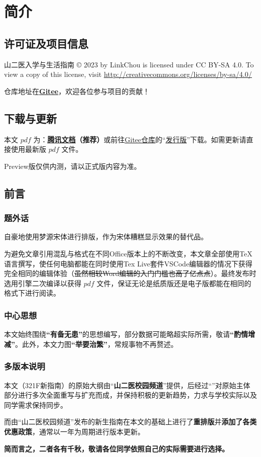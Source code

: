 \chapter[简介]{简介}

\section[许可证及项目信息]{许可证及项目信息}
山二医入学与生活指南 © 2023 by LinkChou is licensed under CC BY-SA 4.0. To view a copy of this license, visit \uline{\href{http://creativecommons.org/licenses/by-sa/4.0/}{http://creativecommons.org/licenses/by-sa/4.0/}}

仓库地址在\textbf{\uline{\href{https://gitee.com/mikazo/guide_for_freshman}{Gitee}}}，欢迎各位参与项目的贡献！

\section[\textcolor{red}{下载与更新}]{下载与更新}
本文 $pdf$ \textbf{}为：\textbf{\uline{\textcolor{red}{\href{https://docs.qq.com/s/ETcQ-ZFSrSsh6MK9bm773q}{腾讯文档}}}（推荐）}或前往\uline{\href{https://gitee.com/mikazo/guide_for_freshman}{Gitee仓库}}的“\uline{\href{https://gitee.com/mikazo/latex_version/releases/latest}{发行版}}”下载。如需更新请直接使用最新版 $pdf$ 文件。

Preview版仅供内测，请以正式版内容为准。

\section[前言]{前言}
\subsection[题外话]{题外话}
自豪地使用梦源宋体进行排版，作为宋体糟糕显示效果的替代品。

为避免文章引用混乱与格式在不同Office版本上的不断改变，本文章全部使用\TeX 语言撰写，使任何电脑都能在同时使用Tex Live套件VSCode编辑器\footnotemark 的情况下获得完全相同的编辑体验（\sout{虽然相较Word编辑的入门门槛也高了亿点点}）。最终发布时选用\XeLaTeX 引擎二次编译以获得 $pdf$ 文件，保证无论是纸质版还是电子版都能在相同的格式下进行阅读。

\subsection[中心思想]{中心思想}
本文始终围绕\textbf{“有备无患”}的思想编写，部分数据可能略超实际所需，敬请\textbf{“酌情增减”}。此外，本文力图\textbf{“举要治繁”}，常规事物不再赘述。

\subsection[多版本说明]{多版本说明}
本文（321F新指南）的原始大纲由“\textbf{山二医校园频道}”提供，后经过“\textbf{}”对原始主体部分进行多次全面重写与扩充而成，并保持积极的更新趋势，力求与学校实际以及同学需求保持同步。

而由“山二医校园频道”发布的新生指南在本文的基础上进行了\textbf{重排版}并\textbf{添加了各类优惠政策}，通常以一年为周期进行版本更新。

\textbf{简而言之，二者各有千秋，敬请各位同学依照自己的实际需要进行选择。}
